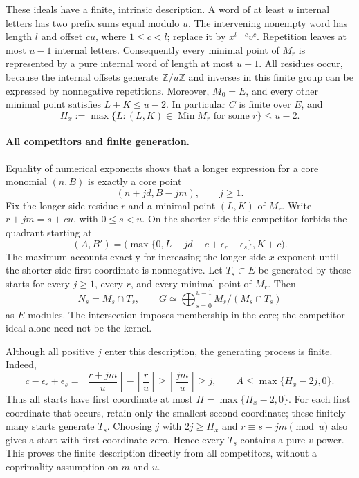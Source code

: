 These ideals have a finite, intrinsic description. A word of at least $u$
internal letters has two prefix sums equal modulo $u$. The intervening
nonempty word has length $l$ and offset $cu$, where $1\le c<l$;
replace it by $x^{l-c}v^c$. Repetition leaves at most $u-1$ internal
letters. Consequently every minimal point of $M_r$ is represented by a
pure internal word of length at most $u-1$. All residues occur, because
the internal offsets generate $\mathbb Z/u\mathbb Z$ and inverses in this
finite group can be expressed by nonnegative repetitions. Moreover,
$M_0=E$, and every other minimal point satisfies $L+K\le u-2$.
In particular $C$ is finite over $E$, and
\[
 H_x:=\max\{L:(L,K)\in\operatorname{Min}M_r\text{ for some }r\}
 \le u-2.
\]

\paragraph{All competitors and finite generation.}
Equality of numerical exponents shows that a longer expression for a
core monomial $(n,B)$ is exactly a core point
\[
 (n+jd,B-jm),\qquad j\ge1.
\]
Fix the longer-side residue $r$ and a minimal point $(L,K)$ of $M_r$.
Write $r+jm=s+cu$, with $0\le s<u$. On the shorter side this
competitor forbids the quadrant starting at
\begin{equation}\label{eq:endpoint-competitor}
 (A,B')=
 \bigl(\max\{0,L-jd-c+\epsilon_r-\epsilon_s\},K+c\bigr).
\end{equation}
The maximum accounts exactly for increasing the longer-side $x$ exponent
until the shorter-side first coordinate is nonnegative.
Let $T_s\subset E$ be generated by these starts for every $j\ge1$,
every $r$, and every minimal point of $M_r$. Then
\begin{equation}\label{eq:endpoint-kernel}
 N_s=M_s\cap T_s,\qquad
 G\simeq\bigoplus_{s=0}^{u-1}M_s/(M_s\cap T_s)
\end{equation}
as $E$-modules. The intersection imposes membership in the core;
the competitor ideal alone need not be the kernel.

Although all positive $j$ enter this description, the generating process
is finite. Indeed,
\[
 c-\epsilon_r+\epsilon_s
 =\left\lceil\frac{r+jm}{u}\right\rceil
  -\left\lceil\frac r u\right\rceil
 \ge\left\lfloor\frac{jm}{u}\right\rfloor\ge j,
 \qquad
 A\le\max\{H_x-2j,0\}.
\]
Thus all starts have first coordinate at most $H=\max\{H_x-2,0\}$.
For each first coordinate that occurs, retain only the smallest second
coordinate; these finitely many starts generate $T_s$.
Choosing $j$ with $2j\ge H_x$ and $r\equiv s-jm\pmod u$ also gives a
start with first coordinate zero. Hence every $T_s$ contains a pure
$v$ power. This proves the finite description directly from all
competitors, without a coprimality assumption on $m$ and $u$.

